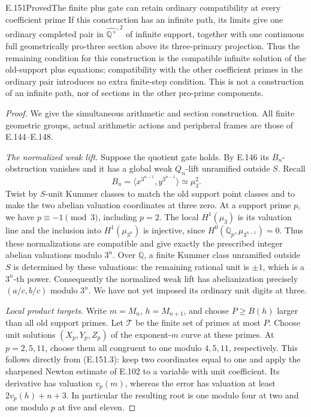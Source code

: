 \begin{result}{E.151}{Proved}{The finite plus gate can retain ordinary compatibility at every coefficient prime}
If this construction has an infinite path, its limits give one
ordinary completed pair in \(\widehat{\mathbb Q^\times}^{,2}\)
of infinite support, together with one continuous full geometrically
pro-three section above its three-primary projection. Thus the
remaining condition for this construction is the compatible infinite
solution of the old-support plus equations; compatibility with the
other coefficient primes in the ordinary pair introduces no extra
finite-step condition. This is not a construction of an infinite
path, nor of sections in the other pro-prime components.
\end{result}
\begin{proof}
We give the simultaneous arithmetic and section construction.
All finite geometric groups, actual arithmetic actions and peripheral
frames are those of E.144--E.148.

\emph{The normalized weak lift.}
Suppose the quotient gate holds. By E.146 its \(B_n\)-obstruction
vanishes and it has a global weak \(Q_n\)-lift unramified outside
\(S\). Recall
\[
 B_n=\langle x^{3^{n-1}},y^{3^{n-1}}\rangle
       \simeq\mu_3^2.
 \tag{E.151.4}
\]
Twist by \(S\)-unit Kummer classes to match the old support point
classes and to make the two abelian valuation coordinates at three
zero. At a support prime \(p\), we have \(p\equiv-1\pmod3\),
including \(p=2\). The local \(H^1(\mu_3)\) is its valuation
line and the inclusion into \(H^1(\mu_{3^n})\) is injective,
since \(H^0(\mathbb Q_p,\mu_{3^{n-1}})=0\). Thus these
normalizations are compatible and give exactly the prescribed
integer abelian valuations modulo \(3^n\).
Over \(\mathbb Q\), a finite Kummer class unramified outside
\(S\) is determined by these valuations: the remaining rational
unit is \(\pm1\), which is a \(3^n\)-th power. Consequently
the normalized weak lift has abelianization precisely
\((a/c,b/c)\) modulo \(3^n\). We have not yet imposed its
ordinary unit digits at three.

\emph{Local product targets.}
Write \(m=M_n\), \(h=M_{n+1}\), and choose \(P\ge B(h)\)
larger than all old support primes. Let \(\mathcal T\) be the
finite set of primes at most \(P\). Choose unit solutions
\((X_p,Y_p,Z_p)\) of the exponent-\(m\) curve at these primes.
At \(p=2,5,11\), choose them all congruent to one modulo
\(4,5,11\), respectively. This follows directly from (E.151.3):
keep two coordinates equal to one and apply the sharpened Newton
estimate of E.102 to a variable with unit coefficient. Its derivative
has valuation \(v_p(m)\), whereas the error has valuation at least
\(2v_p(h)+n+3\). In particular the resulting root is one modulo
four at two and one modulo \(p\) at five and eleven.


\end{proof}
